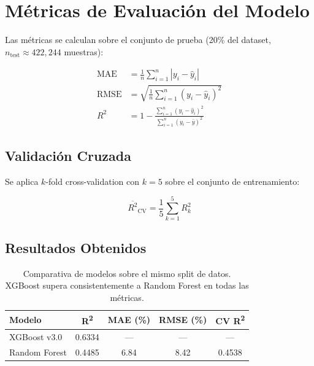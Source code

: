 \documentclass[12pt, a4paper]{article}
\begin{document}
\section{Métricas de Evaluación del Modelo}

Las métricas se calculan sobre el conjunto de prueba (20\% del dataset, $n_{\text{test}} \approx 422{,}244$ muestras):

\begin{align}
  \text{MAE}  &= \frac{1}{n} \sum_{i=1}^{n} \left| y_i - \hat{y}_i \right|
  \label{eq:mae} \\[0.5em]
  \text{RMSE} &= \sqrt{\frac{1}{n} \sum_{i=1}^{n} \left( y_i - \hat{y}_i \right)^2}
  \label{eq:rmse} \\[0.5em]
  R^2         &= 1 - \frac{\displaystyle\sum_{i=1}^{n}(y_i - \hat{y}_i)^2}{\displaystyle\sum_{i=1}^{n}(y_i - \bar{y})^2}
  \label{eq:r2}
\end{align}

\subsection{Validación Cruzada}

Se aplica $k$-fold cross-validation con $k = 5$ sobre el conjunto de entrenamiento:

\begin{equation}
  \overline{R^2}_{\text{CV}} = \frac{1}{5} \sum_{k=1}^{5} R^2_k
  \label{eq:cv_r2}
\end{equation}

\subsection{Resultados Obtenidos}

\begin{table}[h!]
\centering
\begin{tabular}{lcccc}
\toprule
\textbf{Modelo} & \textbf{R\textsuperscript{2}} & \textbf{MAE (\%)} & \textbf{RMSE (\%)} & \textbf{CV R\textsuperscript{2}} \\
\midrule
XGBoost v3.0  & 0.6334 & --- & --- & --- \\
Random Forest & 0.4485 & 6.84 & 8.42 & 0.4538 \\
\bottomrule
\end{tabular}
\caption{Comparativa de modelos sobre el mismo split de datos. XGBoost supera consistentemente a Random Forest en todas las métricas.}
\end{table}
\end{document}

